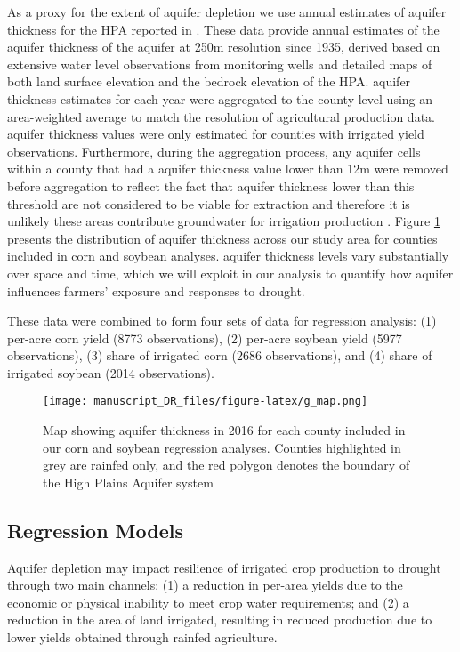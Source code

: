 \documentclass[
]{article}
\begin{document}
As a proxy for the extent of aquifer depletion we use annual estimates of aquifer thickness for the HPA reported in \citet{haacker2016water}. These data provide annual estimates of the aquifer thickness of the aquifer at 250m resolution since 1935, derived based on extensive water level observations from monitoring wells and detailed maps of both land surface elevation and the bedrock elevation of the HPA. aquifer thickness estimates for each year were aggregated to the county level using an area-weighted average to match the resolution of agricultural production data. aquifer thickness values were only estimated for counties with irrigated yield observations. Furthermore, during the aggregation process, any aquifer cells within a county that had a aquifer thickness value lower than 12m were removed before aggregation to reflect the fact that aquifer thickness lower than this threshold are not considered to be viable for extraction and therefore it is unlikely these areas contribute groundwater for irrigation production \citep{fenichel2016measuring,haacker2016water,deines2020transitions}. Figure \ref{fig:sat-dist} presents the distribution of aquifer thickness across our study area for counties included in corn and soybean analyses. aquifer thickness levels vary substantially over space and time, which we will exploit in our analysis to quantify how aquifer influences farmers' exposure and responses to drought. 

These data were combined to form four sets of data for regression analysis: (1) per-acre corn yield (8773 observations), (2) per-acre soybean yield (5977 observations), (3) share of irrigated corn (2686 observations), and (4) share of irrigated soybean (2014 observations). 

\begin{figure}
{\centering \texttt{[image: manuscript\_DR\_files/figure-latex/g\_map.png]}}
\caption{Map showing aquifer thickness in 2016 for each county included in our corn and soybean regression analyses. Counties highlighted in grey are rainfed only, and the red polygon denotes the boundary of the High Plains Aquifer system}\label{fig:sat-dist}
\end{figure}

\hypertarget{methods-models}{%
\subsection{Regression Models}\label{methods-models}}

Aquifer depletion may impact resilience of irrigated crop production to drought through two main channels: (1) a reduction in per-area yields due to the economic or physical inability to meet crop water requirements; and (2) a reduction in the area of land irrigated, resulting in reduced production due to lower yields obtained through rainfed agriculture. 
\end{document}

